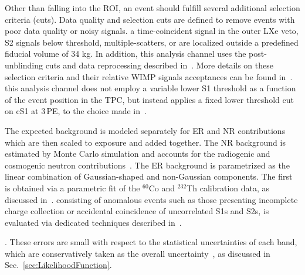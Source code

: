 Other than falling into the ROI, an event should fulfill several additional selection criteria (cuts). Data quality and selection cuts are defined to remove events with poor data quality or noisy signals.  a time-coincident signal in the outer LXe veto, S2 signals below threshold, multiple-scatters, or are localized outside a predefined fiducial volume of 34 kg. In addition, this analysis channel uses the post-unblinding cuts and data reprocessing described in~\cite{xe100_run_combination}. More details on these selection criteria and their relative WIMP signals acceptances can be found in~\cite{Aprile:2012vw,xe100_run_combination}. 
this analysis channel does not employ a variable lower S1 threshold as a function of the event position in the TPC, but instead applies a fixed lower threshold cut on cS1 at 3\,PE,  to the choice made in~\cite{xe100_run_combination}.

The expected background is modeled separately for ER and NR contributions which are then scaled to exposure and added together.
The NR background is estimated by Monte Carlo simulation and accounts for the radiogenic and cosmogenic neutron
contributions~\cite{Aprile:2013tov}. The ER background is parametrized as the linear combination of Gaussian-shaped and non-Gaussian components.
The first is obtained via a parametric fit of the $^{60}$Co and $^{232}$Th calibration data, as discussed in~\cite{xe100_run10_si}.
 consisting of anomalous events such as those 
presenting incomplete charge collection or accidental coincidence of uncorrelated S1s and S2s,  
is evaluated via dedicated techniques described in~\cite{xe100_run_combination}.

.  These errors are small with respect to the statistical uncertainties of each band, which are conservatively taken as the overall uncertainty~\cite{xe100_run_combination}, as discussed in Sec.~\ref{sec:LikelihoodFunction}.

